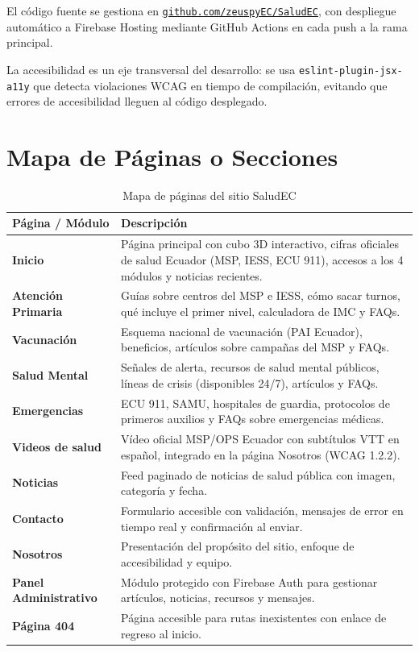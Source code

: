\documentclass[12pt, a4paper]{article}
\begin{document}
El código fuente se gestiona en \href{https://github.com/zeuspyEC/SaludEC}{\texttt{github.com/zeuspyEC/SaludEC}}, con despliegue automático a Firebase Hosting mediante GitHub Actions en cada push a la rama principal.

La accesibilidad es un eje transversal del desarrollo: se usa \texttt{eslint-plugin-jsx-a11y} que detecta violaciones WCAG en tiempo de compilación, evitando que errores de accesibilidad lleguen al código desplegado.

\section{Mapa de Páginas o Secciones}

\begin{table}[H]
\centering
\caption{Mapa de páginas del sitio SaludEC}
\begin{tabular}{@{}>{\bfseries}p{3.5cm} p{10cm}@{}}
\toprule
\rowcolor{royalblue!12}
\textbf{Página / Módulo} & \textbf{Descripción} \\
\midrule
Inicio &
  Página principal con cubo 3D interactivo, cifras oficiales de salud Ecuador (MSP, IESS, ECU 911), accesos a los 4 módulos y noticias recientes. \\
Atención Primaria &
  Guías sobre centros del MSP e IESS, cómo sacar turnos, qué incluye el primer nivel, calculadora de IMC y FAQs. \\
Vacunación &
  Esquema nacional de vacunación (PAI Ecuador), beneficios, artículos sobre campañas del MSP y FAQs. \\
Salud Mental &
  Señales de alerta, recursos de salud mental públicos, líneas de crisis (disponibles 24/7), artículos y FAQs. \\
Emergencias &
  ECU 911, SAMU, hospitales de guardia, protocolos de primeros auxilios y FAQs sobre emergencias médicas. \\
Videos de salud &
  Vídeo oficial MSP/OPS Ecuador con subtítulos VTT en español, integrado en la página Nosotros (WCAG 1.2.2). \\
Noticias &
  Feed paginado de noticias de salud pública con imagen, categoría y fecha. \\
Contacto &
  Formulario accesible con validación, mensajes de error en tiempo real y confirmación al enviar. \\
Nosotros &
  Presentación del propósito del sitio, enfoque de accesibilidad y equipo. \\
Panel Administrativo &
  Módulo protegido con Firebase Auth para gestionar artículos, noticias, recursos y mensajes. \\
Página 404 &
  Página accesible para rutas inexistentes con enlace de regreso al inicio. \\
\bottomrule
\end{tabular}
\end{table}
\end{document}
